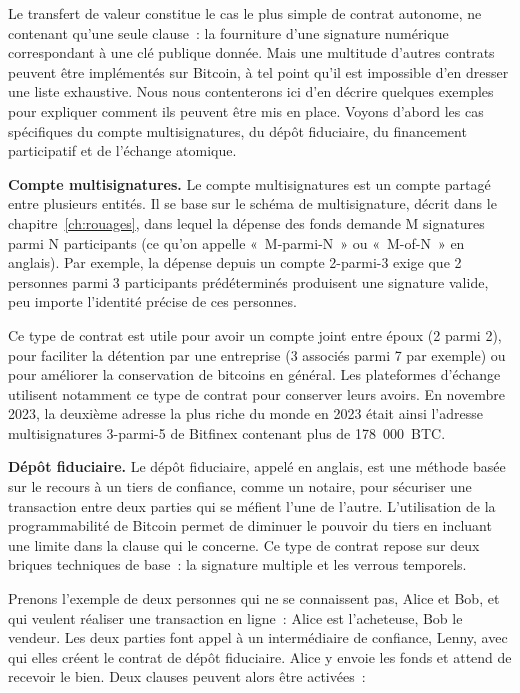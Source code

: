 Le transfert de valeur constitue le cas le plus simple de contrat autonome, ne contenant qu'une seule clause~: la fourniture d'une signature numérique correspondant à une clé publique donnée. Mais une multitude d'autres contrats peuvent être implémentés sur Bitcoin, à tel point qu'il est impossible d'en dresser une liste exhaustive. Nous nous contenterons ici d'en décrire quelques exemples pour expliquer comment ils peuvent être mis en place. Voyons d'abord les cas spécifiques du compte multisignatures, du dépôt fiduciaire, du financement participatif et de l'échange atomique.


\textbf{Compte multisignatures.} Le compte multisignatures est un compte partagé entre plusieurs entités. Il se base sur le schéma de multisignature, décrit dans le chapitre~\ref{ch:rouages}, dans lequel la dépense des fonds demande M signatures parmi N participants (ce qu'on appelle «~M-parmi-N~» ou «~M-of-N~» en anglais). Par exemple, la dépense depuis un compte 2-parmi-3 exige que 2 personnes parmi 3 participants prédéterminés produisent une signature valide, peu importe l'identité précise de ces personnes.

Ce type de contrat est utile pour avoir un compte joint entre époux (2 parmi 2), pour faciliter la détention par une entreprise (3 associés parmi 7 par exemple) ou pour améliorer la conservation de bitcoins en général. Les plateformes d'échange utilisent notamment ce type de contrat pour conserver leurs avoirs. En novembre 2023, la deuxième adresse la plus riche du monde en 2023 était ainsi l'adresse multisignatures 3-parmi-5 de Bitfinex contenant plus de 178~000~BTC.


\textbf{Dépôt fiduciaire.} Le dépôt fiduciaire, appelé  en anglais, est une méthode basée sur le recours à un tiers de confiance, comme un notaire, pour sécuriser une transaction entre deux parties qui se méfient l'une de l'autre. L'utilisation de la programmabilité de Bitcoin permet de diminuer le pouvoir du tiers en incluant une limite dans la clause qui le concerne. Ce type de contrat repose sur deux briques techniques de base~: la signature multiple et les verrous temporels.

Prenons l'exemple de deux personnes qui ne se connaissent pas, Alice et Bob, et qui veulent réaliser une transaction en ligne~: Alice est l'acheteuse, Bob le vendeur. Les deux parties font appel à un intermédiaire de confiance, Lenny, avec qui elles créent le contrat de dépôt fiduciaire. Alice y envoie les fonds et attend de recevoir le bien. Deux clauses peuvent alors être activées~:

